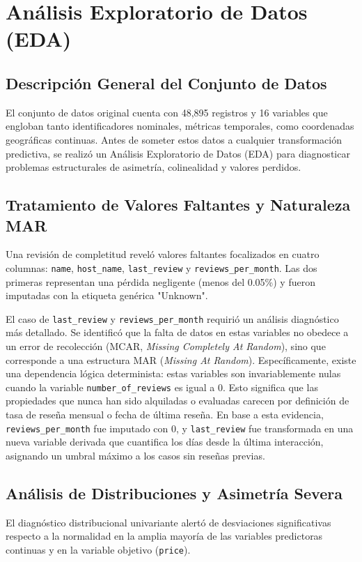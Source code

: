 \chapter{Análisis Exploratorio de Datos (EDA)}

\section{Descripción General del Conjunto de Datos}
El conjunto de datos original cuenta con 48,895 registros y 16 variables que engloban tanto identificadores nominales, métricas temporales, como coordenadas geográficas continuas. Antes de someter estos datos a cualquier transformación predictiva, se realizó un Análisis Exploratorio de Datos (EDA) para diagnosticar problemas estructurales de asimetría, colinealidad y valores perdidos.

\section{Tratamiento de Valores Faltantes y Naturaleza MAR}
Una revisión de completitud reveló valores faltantes focalizados en cuatro columnas: \texttt{name}, \texttt{host\_name}, \texttt{last\_review} y \texttt{reviews\_per\_month}. 
Las dos primeras representan una pérdida negligente (menos del 0.05\%) y fueron imputadas con la etiqueta genérica "Unknown".

El caso de \texttt{last\_review} y \texttt{reviews\_per\_month} requirió un análisis diagnóstico más detallado. Se identificó que la falta de datos en estas variables no obedece a un error de recolección (MCAR, \textit{Missing Completely At Random}), sino que corresponde a una estructura MAR (\textit{Missing At Random}). Específicamente, existe una dependencia lógica determinista: estas variables son invariablemente nulas cuando la variable \texttt{number\_of\_reviews} es igual a 0. Esto significa que las propiedades que nunca han sido alquiladas o evaluadas carecen por definición de tasa de reseña mensual o fecha de última reseña. En base a esta evidencia, \texttt{reviews\_per\_month} fue imputado con 0, y \texttt{last\_review} fue transformada en una nueva variable derivada que cuantifica los días desde la última interacción, asignando un umbral máximo a los casos sin reseñas previas.

\section{Análisis de Distribuciones y Asimetría Severa}
El diagnóstico distribucional univariante alertó de desviaciones significativas respecto a la normalidad en la amplia mayoría de las variables predictoras continuas y en la variable objetivo (\texttt{price}). 

